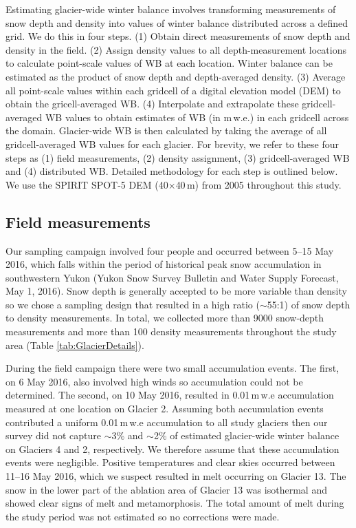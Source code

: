 \documentclass[twocolumn, letterpaper]{igs}
\begin{document}
Estimating glacier-wide winter balance involves transforming measurements of snow depth and density into values of winter balance distributed across a defined grid. We do this in four steps. (1) Obtain direct measurements of snow depth and density in the field. (2) Assign density values to all depth-measurement locations to calculate point-scale values of WB at each location. Winter balance can be estimated as the product of snow depth and depth-averaged density. (3) Average all point-scale values within each gridcell of a digital elevation model (DEM) to obtain the gricell-averaged WB. (4) Interpolate and extrapolate these gridcell-averaged WB values to obtain estimates of WB (in m\,w.e.) in each gridcell across the domain. Glacier-wide WB is then calculated by taking the average of all gridcell-averaged WB values for each glacier. For brevity, we refer to these four steps as (1) field measurements, (2) density assignment, (3) gridcell-averaged WB and (4) distributed WB. Detailed methodology for each step is outlined below. We use the SPIRIT SPOT-5 DEM (40$\times$40\,m) from 2005 \citep{Korona2009} throughout this study.

\subsection{Field measurements}

Our sampling campaign involved four people and occurred between 5--15 May 2016, which falls within the period of historical peak snow accumulation in southwestern Yukon (Yukon Snow Survey Bulletin and Water Supply Forecast, May 1, 2016). Snow depth is generally accepted to be more variable than density \citep{Elder1991, Clark2011, Lopez2013} so we chose a sampling design that resulted in a high ratio ($\sim$55:1) of snow depth to density measurements. In total, we collected more than 9000 snow-depth measurements and more than 100 density measurements throughout the study area (Table \ref {tab:GlacierDetails}).

During the field campaign there were two small accumulation events. The first, on 6 May 2016, also involved high winds so accumulation could not be determined. The second, on 10 May 2016, resulted in 0.01\,m\,w.e accumulation measured at one location on Glacier 2. Assuming both accumulation events contributed a uniform 0.01\,m\,w.e accumulation to all study glaciers then our survey did not capture $\sim$3\% and $\sim$2\% of estimated glacier-wide winter balance on Glaciers 4 and 2, respectively. We therefore assume that these accumulation events were negligible. Positive temperatures and clear skies occurred between 11--16 May 2016, which we suspect resulted in melt occurring on Glacier 13. The snow in the lower part of the ablation area of Glacier 13 was isothermal and showed clear signs of melt and metamorphosis. The total amount of melt during the study period was not estimated so no corrections were made. 
\end{document}
